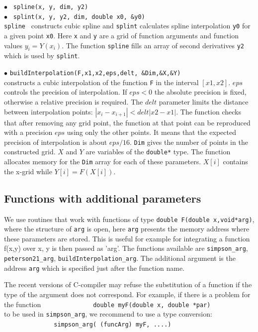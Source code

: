\documentclass[12pt,a4paper]{article}
\begin{document}
\noindent$\bullet$ \verb| spline(x, y, dim, y2)|\\
\noindent$\bullet$ \verb| splint(x, y, y2, dim, double x0, &y0)|\\
{\tt spline } constructs cubic  spline and {\tt splint} calculates spline
interpolation \verb|y0|  for a given point \verb|x0|. Here  {\tt x} and {\tt y} are a 
grid of function arguments and function values $y_i= Y(x_i)$. The 
function {\tt spline} fills   an array of second  derivatives {\tt y2} which is 
used by  {\tt splint}.
   

\noindent$\bullet$ \verb|buildInterpolation(F,x1,x2,eps,delt, &Dim,&X,&Y)|\\
constructs  a cubic interpolation of the function \verb|F| in the interval $[x1,x2]$.
$eps$ controls the precision of interpolation. If $eps < 0$ the absolute 
precision is fixed, otherwise a relative precision is required.
The $delt$ parameter limits the  distance between  interpolation points: $|x_i
-x_{i+1}|<delt|x2-x1|$.  
The function checks that after removing any grid point, the function at that point
can be reproduced with a precision $eps$ using only the other points.  It means that
the expected precision of interpolation is about $eps/16$. \verb|Dim| gives the number 
of points in the  constructed grid. $X$ and $Y$ are variables of the  
\verb|double*| type. The function allocates memory for the  \verb|Dim| array for each 
 of these parameters. $X[i]$ contains the x-grid while $Y[i]=F(X[i])$.

\subsection{Functions with additional parameters}

We use routines that work with functions of type \verb|double F(double x,void*arg)|,  where the structure of \verb|arg| is open, here  {\tt arg} presents the  memory address where these parameters are stored.  This is useful for example for integrating a function f(x,y) over x, y is then passed as 'arg'.
The functions available are \verb|simpson_arg|,  \verb|peterson21_arg|,  \verb|buildInterpolation_arg|. The additional
argument is the address {\tt arg} which is  specified just after the function name.

The recent versions of  C-compiler may refuse the substitution of a function if the type of the argument does not correspond.
For example, if there is a problem  for the function
\verb|              double myF(double x, double *par) |\\ 
to be used in {\tt simpson\_arg}, we recommend to use a type conversion:\\
\verb|              simpson_arg( (funcArg) myF, ....) |
\end{document}
